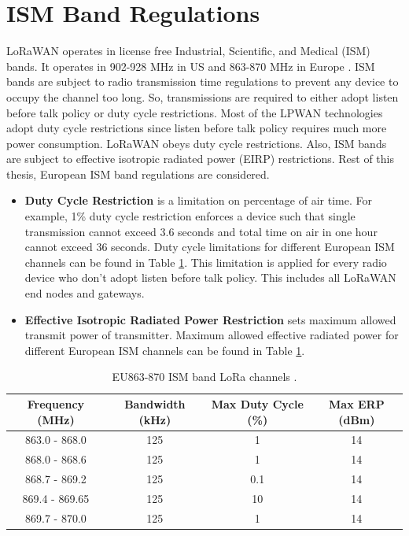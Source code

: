 \section{ISM Band Regulations}
LoRaWAN operates in license free Industrial, Scientific, and Medical (ISM) bands. It operates in 902-928 MHz in US and 863-870 MHz in Europe \cite{lorawan.regional.parameters}. ISM bands are subject to radio transmission time regulations to prevent any device to occupy the channel too long. So, transmissions are required to either adopt listen before talk policy or duty cycle restrictions. Most of the LPWAN technologies adopt duty cycle restrictions since listen before talk policy requires much more power consumption. LoRaWAN obeys duty cycle restrictions. Also, ISM bands are subject to effective isotropic radiated power (EIRP) restrictions. Rest of this thesis, European ISM band regulations are considered.

\begin{itemize}
  \item \textbf{Duty Cycle Restriction} is a limitation on percentage of air time. For example, 1\% duty cycle restriction enforces a device such that single transmission cannot exceed 3.6 seconds and total time on air in one hour cannot exceed 36 seconds. Duty cycle limitations for different European ISM channels can be found in Table \ref{table:max_tx_power}. This limitation is applied for every radio device who don't adopt listen before talk policy. This includes all LoRaWAN end nodes and gateways.
  \item \textbf{Effective Isotropic Radiated Power Restriction} sets maximum allowed transmit power of transmitter. Maximum allowed effective radiated power for different European ISM channels can be found in Table \ref{table:max_tx_power}.
\end{itemize}


\begin{table}
\centering
\caption{EU863-870 ISM band LoRa channels \cite{EN300.220} \cite{lorawan.regional.parameters}.}
\label{table:max_tx_power}
\begin{tabular}{|c|c|c|c|}
\hline
\textbf{Frequency (MHz)} & \textbf{Bandwidth (kHz)} & \textbf{Max Duty Cycle (\%)} & \textbf{Max ERP (dBm)} \\ \hline
      863.0 - 868.0  &   125 &   1   &   14 \\ \hline
      868.0 - 868.6  &   125 &   1   &   14 \\ \hline
      868.7 - 869.2  &   125 &   0.1 &   14 \\ \hline
      869.4 - 869.65 &   125 &   10  &   14 \\ \hline
      869.7 - 870.0  &   125 &   1   &   14 \\ \hline
\end{tabular}
\end{table}
